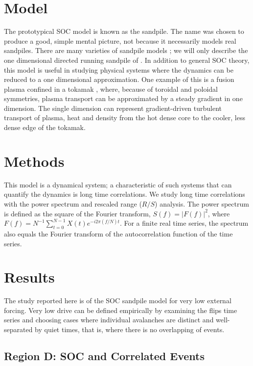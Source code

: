 \section{Model}
\label{sec:partI_one-dimens-runn}

The prototypical SOC model is known as the sandpile.  The name was
chosen to produce a good, simple mental picture, not because it
necessarily models real sandpiles.  There are many varieties of
sandpile models \cite{btw88a,manna1991a,jensen98a}; we will only
describe the one dimensional directed running sandpile of
\cite{hwakardar92a}. In addition to general SOC theory, this model is
useful in studying physical systems where the dynamics can be reduced
to a one dimensional approximation.  One example of this is a fusion
plasma confined in a tokamak \cite{diamond95a,newman96a}, where,
because of toroidal and poloidal symmetries, plasma transport can be
approximated by a steady gradient in one dimension.  The single
dimension can represent gradient-driven turbulent transport of plasma,
heat and density from the hot dense core to the cooler, less dense
edge of the tokamak.

\section{Methods}
\label{sec:partI_methods}

This model is a dynamical system; a characteristic of such systems
that can quantify the dynamics is long time correlations.  We study
long time correlations with the power spectrum and rescaled range
($R/S$) analysis.  The power spectrum is defined as the square of the
Fourier transform, $S(f) = \left|F(f)\right|^2$, where $F(f) = N^{-1}
\sum_{t = 0}^{N - 1} X(t) e^{-i 2 \pi (f / N) t}$.  For a finite real
time series, the spectrum also equals the Fourier transform of the
autocorrelation function of the time series.

\section{Results}
\label{sec:partI_results:-low-drive}

The study reported here is of the SOC sandpile model for very low
external forcing.  Very low drive can be defined empirically by
examining the flips time series and choosing cases where individual
avalanches are distinct and well-separated by quiet times, that is,
where there is no overlapping of events.  

\subsection{Region D:  SOC and Correlated Events}
\label{sec:partI_region-d:-soc}

